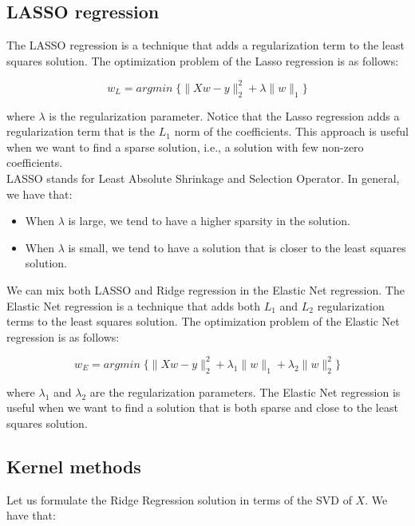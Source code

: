 \subsection{LASSO regression}

The LASSO regression is a technique that adds a regularization term to the least squares solution. The optimization
problem of the Lasso regression is as follows:

\begin{equation}
    w_{L} = argmin \; \{ \|X w - y\|_2^2 + \lambda \|w\|_1 \}
\end{equation}

where $\lambda$ is the regularization parameter. Notice that the Lasso regression adds a regularization term
that is the $L_1$ norm of the coefficients. This approach is useful when we want to find a sparse solution,
i.e., a solution with few non-zero coefficients.\\

LASSO stands for Least Absolute Shrinkage and Selection Operator. In general, we have that:

\begin{itemize}
    \item When $\lambda$ is large, we tend to have a higher sparsity in the solution.
    \item When $\lambda$ is small, we tend to have a solution that is closer to the least squares solution.
\end{itemize}

We can mix both LASSO and Ridge regression in the Elastic Net regression. The Elastic Net regression is a technique
that adds both $L_1$ and $L_2$ regularization terms to the least squares solution. The optimization problem of the
Elastic Net regression is as follows:

\begin{equation}
    w_{E} = argmin \; \{ \|X w - y\|_2^2 + \lambda_1 \|w\|_1 + \lambda_2 \|w\|_2^2 \}
\end{equation}

where $\lambda_1$ and $\lambda_2$ are the regularization parameters. The Elastic Net regression is useful when we want
to find a solution that is both sparse and close to the least squares solution.

\subsection{Kernel methods}

Let us formulate the Ridge Regression solution in terms of the SVD of $X$. We have that:

